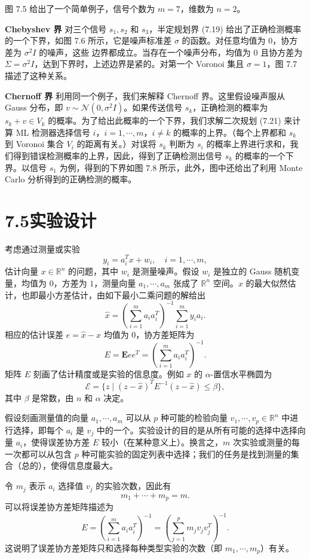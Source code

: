 \documentclass[UTF8, 12pt, fontset=fandol, oneside]{ctexart}
\begin{document}
图 7.5 给出了一个简单例子，信号个数为 $m=7$，维数为 $n=2$。

\noindent\textbf{Chebyshev 界}\quad
对三个信号 $s_1,s_2$ 和 $s_3$，半定规划界 (7.19) 给出了正确检测概率的一个下界，如图 7.6 所示，它是噪声标准差 $\sigma$ 的函数。对任意均值为 $0$，协方差为 $\sigma^2I$ 的噪声，这些
边界都成立。当存在一个噪声分布，均值为 $0$ 且协方差为 $\Sigma=\sigma^2I$，达到下界时，上述边界是紧的。对第一个 Voronoi 集且 $\sigma=1$，图 7.7 描述了这种关系。

\noindent\textbf{Chernoff 界}\quad
利用同一个例子，我们来解释 Chernoff 界。这里假设噪声服从 Gauss 分布，即 $v\sim\mathcal{N}(0,\sigma^2I)$。如果传送信号 $s_k$，正确检测的概率为 $s_k+v\in V_k$ 的概率。为了给出此概率的一个下界，我们求解二次规划 (7.21) 来计算 ML 检测器选择信号
$i$，$i=1,\cdots,m$，$i\neq k$ 的概率的上界。（每个上界都和 $s_k$ 到 Voronoi 集合 $V_i$ 的距离有关。）对误将 $s_k$ 判断为 $s_i$ 的概率上界进行求和，我们得到错误检测概率的上界，因此，得到了正确检测出信号 $s_k$ 的概率的一个下界。以信号 $s_1$ 为例，得到的下界如图 7.8 所示，此外，图中还给出了利用 Monte Carlo 分析得到的正确检测的概率。

\section*{7.5\quad 实验设计}

考虑通过测量或实验
\[
y_i=a_i^Tx+w_i,\quad i=1,\cdots,m,
\]
估计向量 $x\in\mathbb{R}^n$ 的问题，其中 $w_i$ 是测量噪声。假设 $w_i$ 是独立的 Gauss 随机变量，均值为 $0$，方差为 $1$，测量向量 $a_1,\cdots,a_m$ 张成了 $\mathbb{R}^n$ 空间。$x$ 的最大似然估计，也即最小方差估计，由如下最小二乘问题的解给出
\[
\hat{x}=\left(\sum_{i=1}^m a_ia_i^T\right)^{-1}\sum_{i=1}^m y_ia_i.
\]
相应的估计误差 $e=\hat{x}-x$ 均值为 $0$，协方差矩阵为
\[
E=\mathbf{E}ee^T=\left(\sum_{i=1}^m a_ia_i^T\right)^{-1}.
\]
矩阵 $E$ 刻画了估计精度或是实验的信息度。例如 $x$ 的 $\alpha$-置信水平椭圆为
\[
\mathcal{E}=\{z\mid (z-\hat{x})^TE^{-1}(z-\hat{x})\leq \beta\},
\]
其中 $\beta$ 是常数，由 $n$ 和 $\alpha$ 决定。

假设刻画测量值的向量 $a_1,\cdots,a_m$ 可以从 $p$ 种可能的检验向量 $v_1,\cdots,v_p\in\mathbb{R}^n$ 中进行选择，即每个 $a_i$ 是 $v_j$ 中的一个。实验设计的目的是从所有可能的选择中选择向量 $a_i$，使得误差协方差 $E$ 较小（在某种意义上）。换言之，$m$ 次实验或测量的每一次都可以从包含 $p$ 种可能实验的固定列表中选择；我们的任务是找到测量的集合（总的），使得信息度最大。

令 $m_j$ 表示 $a_i$ 选择值 $v_j$ 的实验次数，因此有
\[
m_1+\cdots+m_p=m.
\]
可以将误差协方差矩阵描述为
\[
E=\left(\sum_{i=1}^m a_ia_i^T\right)^{-1}
=\left(\sum_{j=1}^p m_jv_jv_j^T\right)^{-1}.
\]
这说明了误差协方差矩阵只和选择每种类型实验的次数（即 $m_1,\cdots,m_p$）有关。
\end{document}
